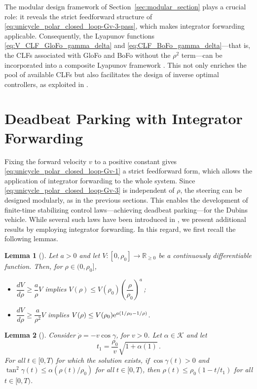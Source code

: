 \documentclass[letterpaper, 10 pt, conference]{ieeeconf}  %
\newtheorem{lemma}{Lemma}
\begin{document}
The modular design framework of Section~\ref{sec:modular_section} plays a crucial role: it reveals the strict feedforward structure of \eqref{eq:unicycle_polar_closed_loop-Gv-3-pass}, which makes integrator forwarding applicable. Consequently, the Lyapunov functions \eqref{eq:V_CLF_GloFo_gamma_delta} and \eqref{eq:CLF_BoFo_gamma_delta}—that is, the CLFs associated with GloFo and BoFo without the $\rho^2$ term—can be incorporated into a composite Lyapunov framework \cite{todorovski2025_CLF}. This not only enriches the pool of available CLFs but also facilitates the design of inverse optimal controllers, as exploited in \cite{Kim2025_IOC}.

\section{Deadbeat Parking with Integrator Forwarding}\label{sec-forward}

Fixing the forward velocity $v$ to a positive constant gives \eqref{eq:unicycle_polar_closed_loop-Gv-1} a strict feedforward form, which allows the application of integrator forwarding to the whole system. Since \eqref{eq:unicycle_polar_closed_loop-Gv-3} is independent of $\rho$, the steering can be designed modularly, as in the previous sections. This enables the development of finite-time stabilizing control laws—achieving deadbeat parking—for the Dubins vehicle. While several such laws have been introduced in \cite{Krstic2025_Dubins}, we present additional results by employing integrator forwarding. In this regard, we first recall the following lemmas.

\begin{lemma}[\!\cite{Krstic2025_Dubins}]
\label{lem1}
Let $a>0$ and let $V:[0,\rho_0]\to\mathbb{R}_{\ge 0}$ be a continuously differentiable function. Then, for $\rho\in(0,\rho_0]$,
\begin{itemize}
\item $\dfrac{dV}{d\rho} \geq \dfrac{a}{\rho}V$ implies $V(\rho)\leq V(\rho_0) \left(\dfrac{\rho}{\rho_0}\right)^a$\,;
\vspace{0.2cm}
\item $\dfrac{dV}{d\rho} \geq \dfrac{a}{\rho^2}V$ implies $V(\rho)\leq V(\rho_0) {\rm e}^{a\left(1/{\rho_0}-{1}/{\rho}\right)}$.
\end{itemize}
\end{lemma}
\vspace{0.2cm}
\begin{lemma}[\!\cite{Krstic2025_Dubins}]
\label{lem2}
Consider $\dot\rho = - v\cos\gamma$, for $v>0$. Let $\alpha\in\mathcal{K}$ and let
\begin{equation}
t_1 = \frac{\rho_0}{v}\sqrt{1+\alpha(1)}\,.
\end{equation}
For all $t\in [0,T)$  for which the solution exists, if $\cos\gamma(t)>0$ and $\tan^2\gamma(t)\leq \alpha(\rho(t)/\rho_0)$ for all $t\in[0,T)$, then $\rho(t)\leq \rho_0(1-t/t_1)$ for all $t\in[0,T)$.
\end{lemma}
\end{document}
